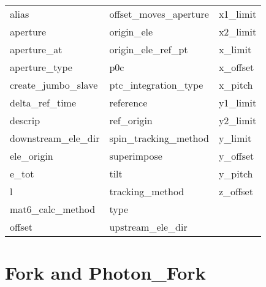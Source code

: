  \begin{tabular}{lll} \toprule
alias                       & offset_moves_aperture       & x1_limit                    \\
aperture                    & origin_ele                  & x2_limit                    \\
aperture_at                 & origin_ele_ref_pt           & x_limit                     \\
aperture_type               & p0c                         & x_offset                    \\
create_jumbo_slave          & ptc_integration_type        & x_pitch                     \\
delta_ref_time              & reference                   & y1_limit                    \\
descrip                     & ref_origin                  & y2_limit                    \\
downstream_ele_dir          & spin_tracking_method        & y_limit                     \\
ele_origin                  & superimpose                 & y_offset                    \\
e_tot                       & tilt                        & y_pitch                     \\
l                           & tracking_method             & z_offset                    \\
mat6_calc_method            & type                        &                             \\
offset                      & upstream_ele_dir            &                             \\
 \bottomrule
 \end{tabular}
 \vfill
 
 \section{Fork and Photon_Fork}
 \label{s:list.fork}
 
